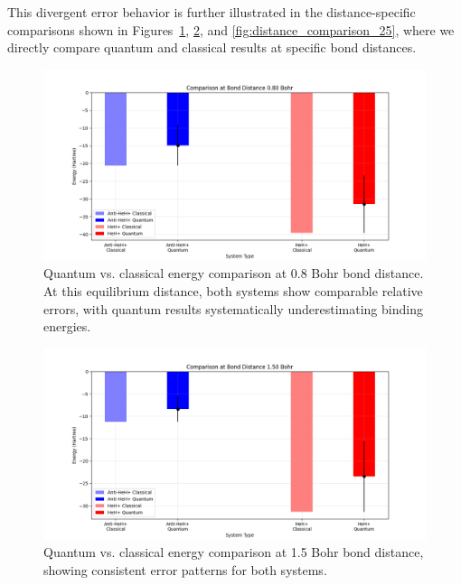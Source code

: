 \documentclass[10pt,twocolumn,a4paper]{article}
\begin{document}
This divergent error behavior is further illustrated in the distance-specific comparisons shown in Figures~\ref{fig:distance_comparison_08}, \ref{fig:distance_comparison_15}, and \ref{fig:distance_comparison_25}, where we directly compare quantum and classical results at specific bond distances.

\begin{figure}[t!]
    \centering
    \includegraphics[width=\columnwidth]{graphs/quantum_comparison_distance_0.80.png}
    \caption{Quantum vs. classical energy comparison at 0.8 Bohr bond distance. At this equilibrium distance, both systems show comparable relative errors, with quantum results systematically underestimating binding energies.}
    \label{fig:distance_comparison_08}
\end{figure}

\begin{figure}[t!]
    \centering
    \includegraphics[width=\columnwidth]{graphs/quantum_comparison_distance_1.50.png}
    \caption{Quantum vs. classical energy comparison at 1.5 Bohr bond distance, showing consistent error patterns for both systems.}
    \label{fig:distance_comparison_15}
\end{figure}
\end{document}
